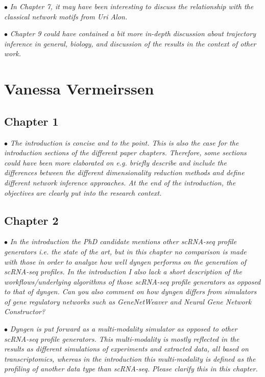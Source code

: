 \documentclass[10pt]{article}
\newcommand{\exam}[2][\  ]{\hspace{0pt}\marginpar{\color{red}#1}$\bullet$ \textit{#2}}
\newcommand{\imp}[1]{{\color{red} #1}}
\newcommand{\nimp}[1]{{\color{gray} #1}}
\newcommand{\bigexclaim}{\raisebox{-0.1em}{\BigTriangleUp}\hspace{-0.32em}\llap{\small\textbf{!}}\hspace{0.32em}}
\newcommand{\tagimp}{\bigexclaim}
\newcommand{\tagtime}{{\Large $\hourglass$}}
\begin{document}
{\exam{In Chapter 7, it may have
been interesting to discuss the relationship with the classical network motifs from Uri Alon.}

\exam{Chapter 9 could have
contained a bit more in-depth discussion about trajectory inference in general, biology, and discussion
of the results in the context of other work.}

 


\section{Vanessa Vermeirssen}


\subsection{Chapter 1}

\exam{\nimp{The introduction is concise and to the point. This is also the case for the introduction sections of the
		different paper chapters. Therefore,} some sections could have been more elaborated on e.g. briefly
		describe and include the differences between the different dimensionality reduction methods and
		define different network inference approaches. \nimp{At the end of the introduction, the objectives are
		clearly put into the research context.}}

	

\subsection{Chapter 2}

\exam[\tagimp \tagtime]{In the introduction the PhD candidate mentions \imp{other scRNA-seq profile generators i.e. the
state of the art, but in this chapter no comparison is made with those in order to analyze how
well dyngen performs on the generation of scRNA-seq profiles.} In the introduction I also lack
a short description of the workflows/underlying algorithms of those scRNA-seq profile
generators as opposed to that of dyngen. Can you also comment on how dyngen differs from
simulators of gene regulatory networks such as GeneNetWeaver and Neural Gene Network
Constructor?}

\exam[\tagimp]{Dyngen is put forward as a multi-modality simulator as opposed to other scRNA-seq profile
generators. \imp{This multi-modality is mostly reflected in the results as different simulations of
experiments and extracted data, all based on transcriptomics, whereas in the introduction
this multi-modality is defined as the profiling of another data type than scRNA-seq.} Please
clarify this in this chapter.}


}
\end{document}
